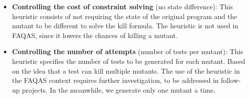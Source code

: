 \begin{itemize}
	\item \textbf{Controlling the cost of constraint solving} (no state difference): This heuristic consists of not requiring the state of the original program and the mutant to be different to solve the kill formula. The heuristic is not used in FAQAS, since it lowers the chances of killing a mutant. 

	\item \textbf{Controlling the number of attempts} (number of tests per mutant): This heuristic specifies the number of tests to be generated for each mutant. Based on the idea that a test can kill multiple mutants. The use of the heuristic in the FAQAS context requires further investigation, to be addressed in follow-up projects. In the meanwhile, we generate only one mutant a time.

\end{itemize}

\ENDCHANGEDWPT

